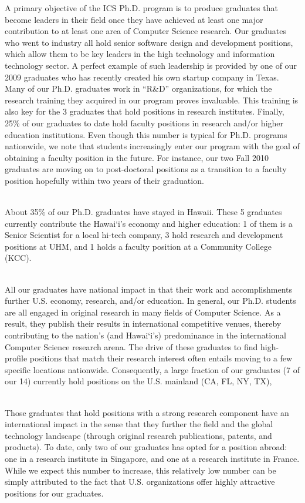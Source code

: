 \documentclass[12pt]{article}
\begin{document}
A primary objective of the ICS Ph.D. program is to produce graduates that
become leaders in their field once they have achieved at least one major
contribution to at least one area of Computer Science research. Our
graduates who went to industry all hold senior software design and
development positions, which allow them to be key leaders in the high
technology and information technology sector. A perfect example of such
leadership is provided by one of our 2009 graduates who has recently
created his own startup company in Texas. Many of our Ph.D. graduates work
in ``R\&D'' organizations, for which the research training they 
acquired in our program proves invaluable.  This training is also key for
the 3 graduates that hold positions in research institutes.  Finally, 25\%
of our graduates to date hold faculty positions in research and/or higher
education institutions. Even though this number is typical for Ph.D.
programs nationwide, we note that students increasingly enter our program
with the goal of obtaining a faculty position in the future. For instance,
our two Fall 2010 graduates are moving on to post-doctoral positions as a
transition to a faculty position hopefully within two years of their
graduation.

~\\
 About 35\% of our Ph.D. graduates have
stayed in Hawaii.  These 5 graduates currently contribute the Hawai`i's
economy and higher education: 1 of them is a Senior Scientist for a
local hi-tech company, 3 hold research and development positions
at UHM, and 1 holds a faculty position at a Community College (KCC). 

~\\
 All our graduates have
national impact in that their work and accomplishments further U.S.
economy, research, and/or education.  In general, our Ph.D. students
are all engaged in original research in many fields of Computer
Science. As a result, they publish their results in international
competitive venues, thereby contributing to the nation's (and
Hawai`i's) predominance in the international Computer Science research
arena.  The drive of these graduates to find high-profile positions
that match their research interest often entails moving to a few
specific locations nationwide.  Consequently, a large fraction of our
graduates (7 of our 14) currently hold positions on the U.S. mainland
(CA, FL, NY, TX),

~\\
 Those graduates that
hold positions with a strong research component have an international
impact in the sense that they further the field and the global technology
landscape (through original research publications, patents, and
products). To date, only two of our graduates has opted for a position
abroad: one in a research institute in Singapore, and one at a research
institute in France. While we expect this number to increase, this
relatively low number can be simply attributed to the fact that
U.S. organizations offer highly attractive positions for our graduates.
\end{document}
